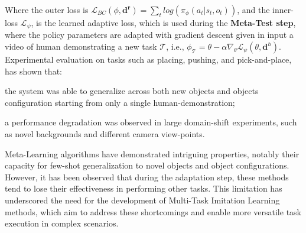 \newline Where the outer loss is $\mathcal{L}_{BC}(\phi,\mathbf{d^{r}}) = \sum_{t} log(\pi_{\phi}(a_{t}|s_{t},o_{t}))$, and the inner-loss $\mathcal{L}_{\psi}$, is the learned adaptive loss, which is used during the \textbf{Meta-Test step}, where the policy parameters are adapted with gradient descent given in input a video of human demonstrating a new task $\mathcal{T}$, i.e., $\phi_{\mathcal{T}} = \theta - \alpha \nabla_{\theta} \mathcal{L}_{\psi}(\theta, \mathbf{d}^{h})$. Experimental evaluation on tasks such as placing, pushing, and pick-and-place, has shown that: \begin{enumerate*}[label=\textbf{(\alph*)}]
    \item the system was able to generalize across both new objects and objects configuration starting from only a single human-demonstration;
    \item a performance degradation was observed in large domain-shift experiments, such as novel backgrounds and different camera view-points.
\end{enumerate*}

Meta-Learning algorithms have demonstrated intriguing properties, notably their capacity for few-shot generalization to novel objects and object configurations. However, it has been observed that during the adaptation step, these methods tend to lose their effectiveness in performing other tasks. This limitation has underscored the need for the development of Multi-Task Imitation Learning methods, which aim to address these shortcomings and enable more versatile task execution in complex scenarios.

